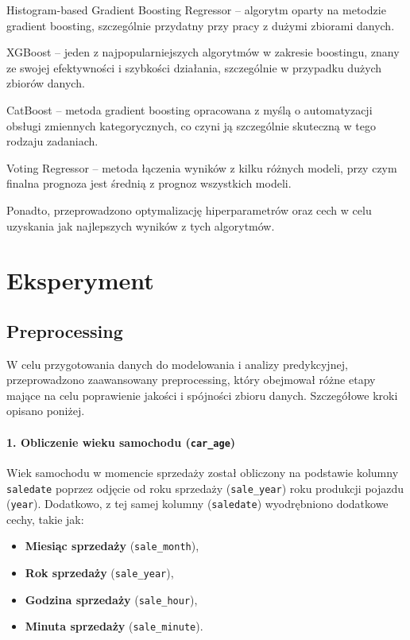 \documentclass[10pt,letterpaper]{article}
\begin{document}
Histogram-based Gradient Boosting Regressor – algorytm oparty na metodzie gradient boosting, szczególnie przydatny przy pracy z dużymi zbiorami danych.

XGBoost – jeden z najpopularniejszych algorytmów w zakresie boostingu, znany ze swojej efektywności i szybkości działania, szczególnie w przypadku dużych zbiorów danych.

CatBoost – metoda gradient boosting opracowana z myślą o automatyzacji obsługi zmiennych kategorycznych, co czyni ją szczególnie skuteczną w tego rodzaju zadaniach.

Voting Regressor – metoda łączenia wyników z kilku różnych modeli, przy czym finalna prognoza jest średnią z prognoz wszystkich modeli.

Ponadto, przeprowadzono optymalizację hiperparametrów oraz cech w celu uzyskania jak najlepszych wyników z tych algorytmów. 

\newpage
\section{Eksperyment}
\subsection{Preprocessing}

W celu przygotowania danych do modelowania i analizy predykcyjnej, przeprowadzono zaawansowany preprocessing, który obejmował różne etapy mające na celu poprawienie jakości i spójności zbioru danych. Szczegółowe kroki opisano poniżej.

\paragraph{1. Obliczenie wieku samochodu (\texttt{car\_age})}
Wiek samochodu w momencie sprzedaży został obliczony na podstawie kolumny \texttt{saledate} poprzez odjęcie od roku sprzedaży (\texttt{sale\_year}) roku produkcji pojazdu (\texttt{year}). Dodatkowo, z tej samej kolumny (\texttt{saledate}) wyodrębniono dodatkowe cechy, takie jak:
\begin{itemize}
    \item \textbf{Miesiąc sprzedaży} (\texttt{sale\_month}),
    \item \textbf{Rok sprzedaży} (\texttt{sale\_year}),
    \item \textbf{Godzina sprzedaży} (\texttt{sale\_hour}),
    \item \textbf{Minuta sprzedaży} (\texttt{sale\_minute}).
\end{itemize}
\end{document}

